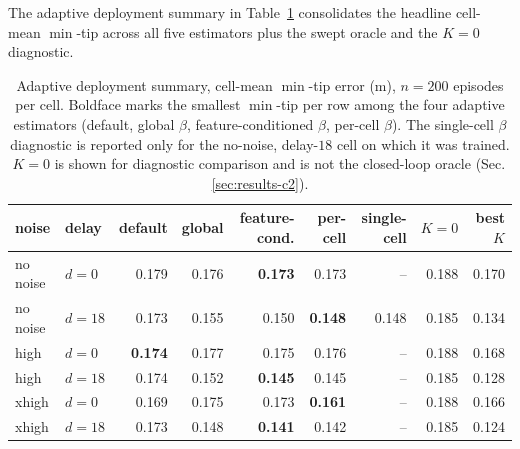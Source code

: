 \documentclass[sn-mathphys,NameDate,iicol]{sn-jnl}
\begin{document}
The adaptive deployment summary in
Table~\ref{tab:r3_stage_c_deploy} consolidates the headline cell-mean
$\min$-tip across all five estimators plus the swept oracle and the
$K\!=\!0$ diagnostic.

\begin{table}[!htbp]
\centering
\caption{Adaptive deployment summary, cell-mean $\min$-tip error
(m), $n{=}200$ episodes per cell. Boldface marks the smallest
$\min$-tip per row among the four adaptive estimators
(default, global $\beta$, feature-conditioned $\beta$, per-cell $\beta$).
The single-cell $\beta$ diagnostic is reported only for the no-noise,
delay-$18$ cell on which it was trained.
$K{=}0$ is shown for diagnostic comparison and is not the
closed-loop oracle (Sec.\,\ref{sec:results-c2}).}
\setlength{\tabcolsep}{3pt}
\footnotesize
\begin{tabular}{@{}ll rrrrr rr@{}}
\toprule
noise & delay & default & global & feature-cond. & per-cell & single-cell
 & $K{=}0$ & best $K$ \\
\midrule
no noise & $d{=}0$ & 0.179 & 0.176 & \textbf{0.173} & 0.173 & -- & 0.188 & 0.170 \\
no noise & $d{=}18$ & 0.173 & 0.155 & 0.150 & \textbf{0.148} & 0.148 & 0.185 & 0.134 \\
high & $d{=}0$ & \textbf{0.174} & 0.177 & 0.175 & 0.176 & -- & 0.188 & 0.168 \\
high & $d{=}18$ & 0.174 & 0.152 & \textbf{0.145} & 0.145 & -- & 0.185 & 0.128 \\
xhigh & $d{=}0$ & 0.169 & 0.175 & 0.173 & \textbf{0.161} & -- & 0.188 & 0.166 \\
xhigh & $d{=}18$ & 0.173 & 0.148 & \textbf{0.141} & 0.142 & -- & 0.185 & 0.124 \\
\bottomrule
\end{tabular}
\label{tab:r3_stage_c_deploy}
\end{table}

\end{document}
